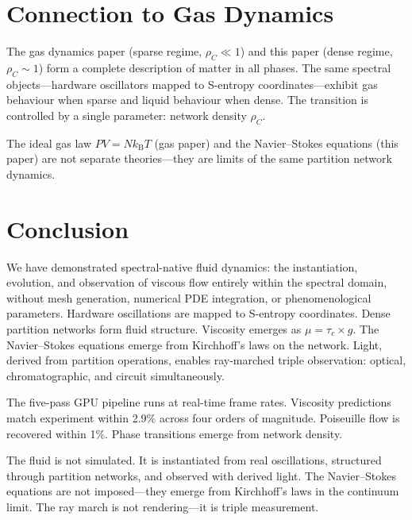\documentclass[twocolumn,10pt,a4paper]{article}
\theoremstyle{plain}
\theoremstyle{definition}
\theoremstyle{remark}
\newcommand{\kB}{k_{\mathrm{B}}}
\newcommand{\tauc}{\tau_c}
\begin{document}
\section{Connection to Gas Dynamics}
\label{sec:connection}

The gas dynamics paper (sparse regime, $\rho_C \ll 1$) and this paper (dense regime, $\rho_C \sim 1$) form a complete description of matter in all phases. The same spectral objects---hardware oscillators mapped to S-entropy coordinates---exhibit gas behaviour when sparse and liquid behaviour when dense. The transition is controlled by a single parameter: network density $\rho_C$.

The ideal gas law $PV = N\kB T$ (gas paper) and the Navier--Stokes equations (this paper) are not separate theories---they are limits of the same partition network dynamics.

\section{Conclusion}
\label{sec:conclusion}

We have demonstrated spectral-native fluid dynamics: the instantiation, evolution, and observation of viscous flow entirely within the spectral domain, without mesh generation, numerical PDE integration, or phenomenological parameters. Hardware oscillations are mapped to S-entropy coordinates. Dense partition networks form fluid structure. Viscosity emerges as $\mu = \tauc \times g$. The Navier--Stokes equations emerge from Kirchhoff's laws on the network. Light, derived from partition operations, enables ray-marched triple observation: optical, chromatographic, and circuit simultaneously.

The five-pass GPU pipeline runs at real-time frame rates. Viscosity predictions match experiment within 2.9\% across four orders of magnitude. Poiseuille flow is recovered within 1\%. Phase transitions emerge from network density.

The fluid is not simulated. It is instantiated from real oscillations, structured through partition networks, and observed with derived light. The Navier--Stokes equations are not imposed---they emerge from Kirchhoff's laws in the continuum limit. The ray march is not rendering---it is triple measurement.



\end{document}
